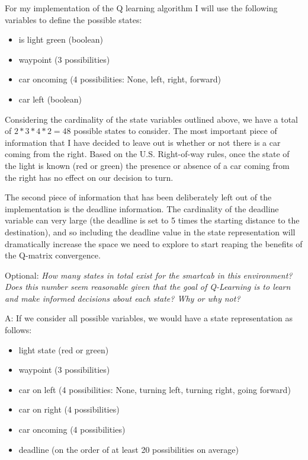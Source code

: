 \documentclass[conference]{IEEEtran}
\begin{document}
For my implementation of the Q learning algorithm I will use the
following variables to define the possible states:

\begin{itemize}
\item is light green (boolean)
\item waypoint (3 possibilities)
\item car oncoming (4 possibilities: None, left, right, forward)
\item car left (boolean)
\end{itemize}

Considering the cardinality of the state variables outlined above, we have a
total of $2 * 3 * 4 * 2 = 48$ possible states to consider.  The most important
piece of information that I have decided to leave out is whether or not there
is a car coming from the right. Based on the U.S. Right-of-way rules, once
the state of the light is known (red or green) the presence or absence of
a car coming from the right has no effect on our decision to turn. 

The second piece of information that has been deliberately left out of the
implementation is the deadline information.  The cardinality of the deadline
variable can very large (the deadline is set to 5 times the starting distance
to the destination), and so including the deadline value in the state
representation will dramatically increase the space we need to explore to 
start reaping the benefits of the Q-matrix convergence.


\vspace{1em}
\noindent Optional: \textit{How many states in total exist for the smartcab in
this environment? Does this number seem reasonable given that the goal of
Q-Learning is to learn and make informed decisions about each state? Why or why
not?}


\vspace{2em} \noindent A: If we consider all possible variables, we would have
a state representation as follows:

\begin{itemize}
\item light state (red or green)
\item waypoint (3 possibilities)
\item car on left (4 possibilities: None, turning left, turning right, going forward)
\item car on right (4 possibilities)
\item car oncoming (4 possibilities)
\item deadline (on the order of at least 20 possibilities on average)
\end{itemize}
\end{document}
